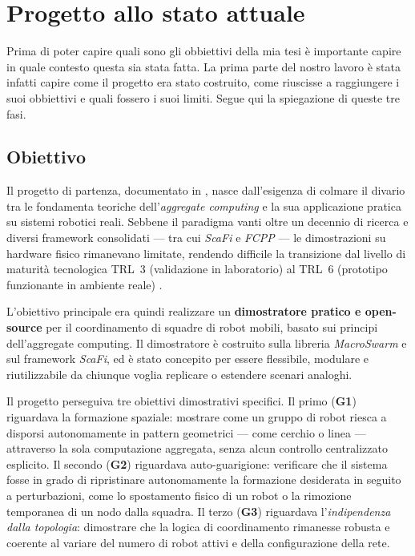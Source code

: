\section{Progetto allo stato attuale}
\label{sec:progetto-allo-stato-attuale}
%
Prima di poter capire quali sono gli obbiettivi della mia tesi è importante capire in quale contesto questa sia stata fatta.
La prima parte del nostro lavoro è stata infatti capire come il progetto era stato costruito, come riuscisse a raggiungere i suoi obbiettivi e quali fossero i suoi limiti.
Segue qui la spiegazione di queste tre fasi.
%
\subsection{Obiettivo}
\label{subsec:obbiettivo}
%
Il progetto di partenza, documentato in \cite{aguzzi2025demo}, nasce dall'esigenza di colmare il divario tra le
fondamenta teoriche dell'\textit{aggregate computing} e la sua applicazione
pratica su sistemi robotici reali. Sebbene il paradigma vanti oltre un decennio
di ricerca e diversi framework consolidati --- tra cui \textit{ScaFi}
\cite{casadei2022scafi} e \textit{FCPP} \cite{audrito2024fcpp} --- le
dimostrazioni su hardware fisico rimanevano limitate, rendendo difficile la
transizione dal livello di maturità tecnologica TRL~3 (validazione in
laboratorio) al TRL~6 (prototipo funzionante in ambiente reale)
\cite{olechowski2015trl}.

L'obiettivo principale era quindi realizzare un \textbf{dimostratore pratico e
    open-source} per il coordinamento di squadre di robot mobili, basato sui
principi dell'aggregate computing. Il dimostratore è costruito sulla libreria
\textit{MacroSwarm} \cite{aguzzi2024macroswarm} e sul framework \textit{ScaFi},
ed è stato concepito per essere flessibile, modulare e riutilizzabile da
chiunque voglia replicare o estendere scenari analoghi.

Il progetto perseguiva tre obiettivi dimostrativi specifici. Il primo
(\textbf{G1}) riguardava la formazione spaziale: mostrare come un
gruppo di robot riesca a disporsi autonomamente in pattern geometrici --- come
cerchio o linea --- attraverso la sola computazione aggregata, senza alcun
controllo centralizzato esplicito. Il secondo (\textbf{G2}) riguardava auto-guarigione: verificare che il sistema fosse in grado di
ripristinare autonomamente la formazione desiderata in seguito a perturbazioni, come lo spostamento fisico di un robot o la rimozione temporanea
di un nodo dalla squadra. Il terzo (\textbf{G3}) riguardava
l'\textit{indipendenza dalla topologia}: dimostrare che la logica di
coordinamento rimanesse robusta e coerente al variare del numero di robot
attivi e della configurazione della rete.


